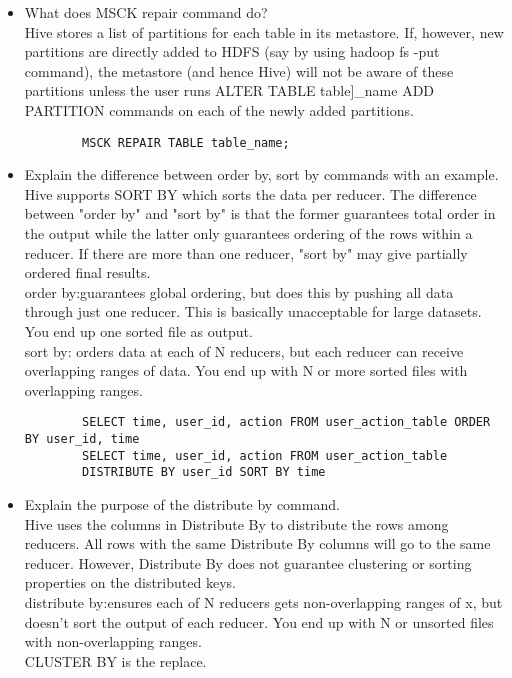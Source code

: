 \documentclass[12pt]{article}
\begin{document}
	\begin{itemize}
		\item What does MSCK repair command do?\\
		Hive stores a list of partitions for each table in its metastore. If, however, new partitions are directly added to HDFS (say by using hadoop fs -put command), the metastore (and hence Hive) will not be aware of these partitions unless the user runs ALTER TABLE table]\_name ADD PARTITION commands on each of the newly added partitions.
		\begin{lstlisting}
		MSCK REPAIR TABLE table_name;
		\end{lstlisting}
		
		\item Explain the difference between order by, sort by commands with an example. \\
		Hive supports SORT BY which sorts the data per reducer. The difference between "order by" and "sort by" is that the former guarantees total order in the output while the latter only guarantees ordering of the rows within a reducer. If there are more than one reducer, "sort by" may give partially ordered final results.\\
		
		order by:guarantees global ordering, but does this by pushing all data through just one reducer. This is basically unacceptable for large datasets. You end up one sorted file as output.\\
		
		sort by: orders data at each of N reducers, but each reducer can receive overlapping ranges of data. You end up with N or more sorted files with overlapping ranges.\\
		
		\begin{lstlisting}
		SELECT time, user_id, action FROM user_action_table ORDER BY user_id, time
		SELECT time, user_id, action FROM user_action_table
		DISTRIBUTE BY user_id SORT BY time
		\end{lstlisting}
		\item Explain the purpose of the distribute by command.\\
		Hive uses the columns in Distribute By to distribute the rows among reducers. All rows with the same Distribute By columns will go to the same reducer. However, Distribute By does not guarantee clustering or sorting properties on the distributed keys.\\
		distribute by:ensures each of N reducers gets non-overlapping ranges of x, but doesn't sort the output of each reducer. You end up with N or unsorted files with non-overlapping ranges.\\
	  CLUSTER BY is the replace.
	  

\end{itemize}
\end{document}

